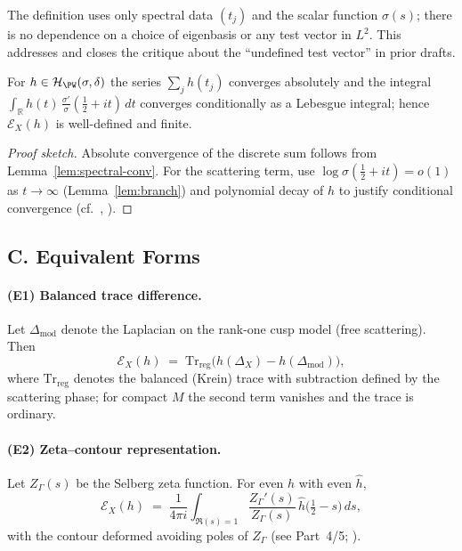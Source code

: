 \begin{remark}
The definition uses only spectral data $(t_j)$ and the scalar function $\sigma(s)$; there is no dependence on a choice of eigenbasis or any test vector in $L^2$. This addresses and closes the critique about the ``undefined test vector'' in prior drafts.
\end{remark}

\begin{lemma}
\label{lem:well-defined}
For $h\in\mathcal H_{\PW}(\sigma,\delta)$ the series $\sum_j h(t_j)$ converges absolutely and the integral
$\int_{\mathbb R} h(t)\,\frac{\sigma'}{\sigma}(\tfrac12+it)\,dt$ converges conditionally as a Lebesgue integral; hence $\mathcal E_X(h)$ is well-defined and finite.
\end{lemma}

\begin{proof}[Proof sketch]
Absolute convergence of the discrete sum follows from Lemma~\ref{lem:spectral-conv}. For the scattering term, use $\log \sigma(\tfrac12+it)=o(1)$ as $t\to\infty$ (Lemma~\ref{lem:branch}) and polynomial decay of $h$ to justify conditional convergence (cf.\ \cite[Ch.~3]{Hejhal1983II}, \cite{LaxPhillips1976}).
\end{proof}


\subsection*{C. Equivalent Forms}
\label{subsec:equiv-forms}

\paragraph{(E1) Balanced trace difference.}
Let $\Delta_{\mathrm{mod}}$ denote the Laplacian on the rank-one cusp model (free scattering). Then
\begin{equation}
\label{eq:trace-model}
  \mathcal E_X(h)
  \;=\;
  \mathrm{Tr}_{\mathrm{reg}}\!\big(h(\Delta_X)-h(\Delta_{\mathrm{mod}})\big),
\end{equation}
where $\mathrm{Tr}_{\mathrm{reg}}$ denotes the balanced (Krein) trace with subtraction defined by the scattering phase; for compact $M$ the second term vanishes and the trace is ordinary.

\paragraph{(E2) Zeta–contour representation.}
Let $Z_\Gamma(s)$ be the Selberg zeta function. For even $h$ with even $\hat h$,
\begin{equation}
\label{eq:zeta-contour}
  \mathcal E_X(h)
  \;=\;
  \frac{1}{4\pi i}\int_{\Re(s)=1}\frac{Z_\Gamma'(s)}{Z_\Gamma(s)}\,\hat h\!\Big(\tfrac12 - s\Big)\,ds,
\end{equation}
with the contour deformed avoiding poles of $Z_\Gamma$ (see Part~4/5; \cite{Selberg1956,Hejhal1983}).

